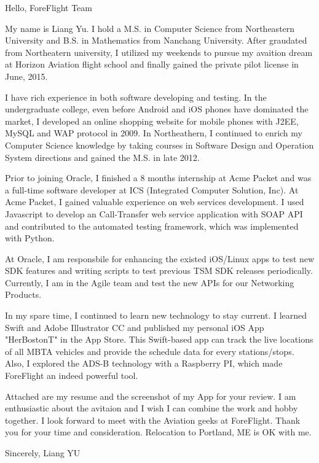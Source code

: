 Hello, ForeFlight Team

My name is Liang Yu. I hold a M.S. in Computer Science from Northeastern University and B.S. in Mathematics from Nanchang University. After graudated from Northeatern university, I utilized my weekends to pursue my avaition dream at Horizon Aviation flight school and finally gained the private pilot license in June, 2015. 

I have rich experience in both software developing and testing. In the undergraduate college, even before Android and iOS phones have dominated the market, I developed an online shopping website for mobile phones with J2EE, MySQL and WAP protocol in 2009. In Northeathern, I continued to enrich my Computer Science knowledge by taking courses in Software Design and Operation System directions and gained the M.S. in late 2012.

Prior to joining Oracle, I finished a 8 months internship at Acme Packet and was a full-time software developer at ICS (Integrated Computer Solution, Inc). At Acme Packet, I gained valuable experience on web services development. I used Javascript to develop an Call-Transfer web service application with SOAP API and contributed to the automated testing framework, which was implemented with Python.

At Oracle, I am responsbile for enhancing the existed iOS/Linux apps to test new SDK features and writing scripts to test previous TSM SDK releases periodically. Currently, I am in the Agile team and test the new APIs for our Networking Products. 

In my spare time, I continued to learn new technology to stay current. I learned Swift and Adobe Illustrator CC and published my personal iOS App "HerBostonT" in the App Store. This Swift-based app can track the live locations of all MBTA vehicles and provide the schedule data for every stations/stops. Also, I explored the ADS-B technology with a Raspberry PI, which made ForeFlight an indeed powerful tool.

Attached are my resume and the screenshot of my App for your review. I am enthusiastic about the avitaion and I wish I can combine the work and hobby together. I look forward to meet with the Aviation geeks at ForeFlight. Thank you for your time and consideration. Relocation to Portland, ME is OK with me. 


Sincerely,
Liang YU


